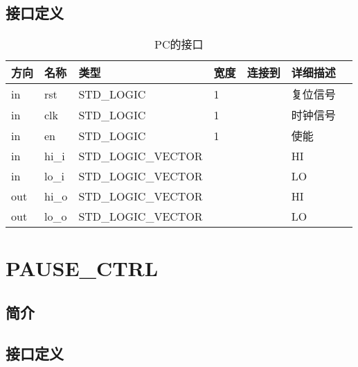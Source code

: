 \documentclass{article}
\begin{document}
\FloatBarrier
\subsection{接口定义}

\begin{table}
    \centering
    \begin{tabular}{llllllp{2cm}}
    \toprule
    方向 & 名称 & 类型 & 宽度 & 连接到 & 详细描述 \\ \midrule
    in & rst\label{HI/LO:rst} & STD_LOGIC & 1 & \nameref{sec:MIPS_CPU} & 复位信号 \\
    in & clk\label{HI/LO:clk} & STD_LOGIC & 1 & \nameref{sec:MIPS_CPU} & 时钟信号 \\
    in & en\label{HI/LO:en} & STD_LOGIC & 1 & \nameref{sec:MEM/WB} & 使能 \\
    in & hi_i\label{HI/LO:hi_i} & STD_LOGIC_VECTOR & \nameref{const:REG_DATA_LEN} & \nameref{sec:MEM/WB} & HI \\
    in & lo_i\label{HI/LO:lo_i} & STD_LOGIC_VECTOR & \nameref{const:REG_DATA_LEN} & \nameref{sec:MEM/WB} & LO \\
    out & hi_o\label{HI/LO:hi_o} & STD_LOGIC_VECTOR & \nameref{const:REG_DATA_LEN} & \nameref{sec:EX} & HI \\
    out & lo_o\label{HI/LO:lo_o} & STD_LOGIC_VECTOR & \nameref{const:REG_DATA_LEN} & \nameref{sec:EX} & LO \\
    \bottomrule
    \end{tabular}
    \caption {PC的接口}
\end{table}
\FloatBarrier

\section{PAUSE_CTRL}
\label{sec:PAUSE_CTRL}

\subsection{简介}

\FloatBarrier
\subsection{接口定义}
\end{document}
